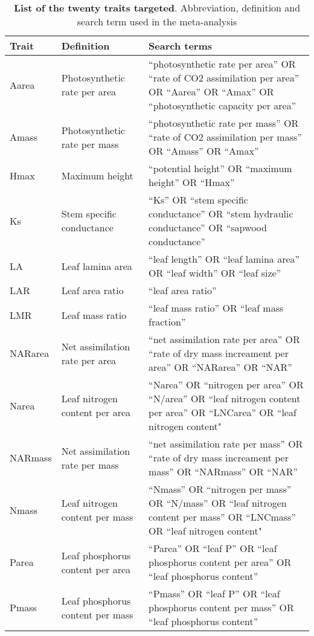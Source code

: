\documentclass[a4paper]{article}\usepackage[]{graphicx}\usepackage[]{color}
\begin{document}
\begin{appendices}
\begin{table}[h!]
\centering
\caption{\textbf{List of the twenty traits targeted}. Abbreviation,
definition and search term used in the meta-analysis}
\label{tab:lit_search}
\vspace{0.5cm}
\begin{tabular}{p{3cm}p{3cm}p{8cm}}
  \hline
Trait & Definition & Search terms \\
  \hline
Aarea & Photosynthetic rate per area & ``photosynthetic rate per area'' OR ``rate of CO2 assimilation per area'' OR ``Aarea'' OR ``Amax'' OR ``photosynthetic capacity per area'' \\
  Amass & Photosynthetic rate per mass & ``photosynthetic rate per mass'' OR ``rate of CO2 assimilation per mass'' OR ``Amass'' OR ``Amax'' \\
  Hmax & Maximum height & ``potential height'' OR ``maximum height'' OR ``Hmax'' \\
  Ks & Stem specific conductance & ``Ks'' OR ``stem specific conductance'' OR ``stem hydraulic conductance'' OR ``sapwood conductance'' \\
  LA & Leaf lamina area & ``leaf length'' OR ``leaf lamina area'' OR ``leaf width'' OR ``leaf size'' \\
  LAR & Leaf area ratio & ``leaf area ratio'' \\
  LMR & Leaf mass ratio & ``leaf mass ratio'' OR ``leaf mass fraction'' \\
  NARarea & Net assimilation rate per area &  ``net assimilation rate per area'' OR ``rate of dry mass increament per area'' OR ``NARarea'' OR ``NAR'' \\
  Narea & Leaf nitrogen content per area & ``Narea'' OR ``nitrogen per area'' OR ``N/area'' OR ``leaf nitrogen content per area'' OR ``LNCarea'' OR ``leaf nitrogen content" \\
  NARmass & Net assimilation rate per mass &  ``net assimilation rate per mass'' OR ``rate of dry mass increament per mass'' OR ``NARmass'' OR ``NAR'' \\
  Nmass & Leaf nitrogen content per mass & ``Nmass'' OR ``nitrogen per mass'' OR ``N/mass'' OR ``leaf nitrogen content per mass'' OR ``LNCmass'' OR ``leaf nitrogen content" \\
  Parea & Leaf phosphorus content per area & ``Parea'' OR ``leaf P'' OR  ``leaf phosphorus content per area''  OR ``leaf phosphorus content'' \\
  Pmass & Leaf phosphorus content per mass & ``Pmass'' OR ``leaf P'' OR  ``leaf phosphorus content per mass'' OR ``leaf phosphorus content'' \\

\end{tabular}
\end{table}
\end{appendices}
\end{document}
